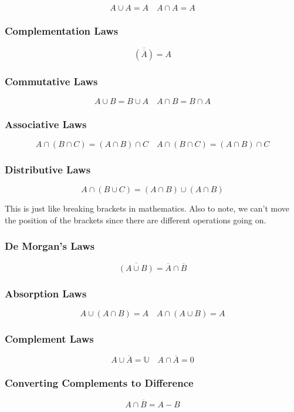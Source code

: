 \[
    A \cup A = A \quad A \cap A = A
\]

\subsubsection{Complementation Laws}\label{ssub:complementation_laws}

\[
    \overline{(\overline{A})} = A
\]

\subsubsection{Commutative Laws}\label{ssub:commutativepafour}

\[
    A \cup B = B \cup A \quad A \cap B = B\cap A
\]

\subsubsection{Associative Laws}\label{ssub:associateivepafour}

\[
    A \cap (B \cap C) = (A \cap B) \cap C \quad A \cap (B \cap C) = (A \cap B) \cap C
\]

\subsubsection{Distributive Laws}\label{ssub:distributive_laws}

\[
    A \cap (B \cup C) = (A \cap B) \cup (A \cap B)
\]
\begin{note}
    This is just like breaking brackets in mathematics. Also to note, we can't move the position of the brackets since there are different operations going on.
\end{note}

\subsubsection{De Morgan's Laws}\label{ssub:de_morgan_s_laws}

\[
    \overline{(A \cup B)} = \overline{A} \cap \overline{B}
\]

\subsubsection{Absorption Laws}\label{ssub:absorption_laws}

\[
    A \cup (A \cap B) = A \quad A \cap (A \cup B) = A
\]

\subsubsection{Complement Laws}\label{ssub:complement_laws}

\[
    A \cup \overline{A} = \mathbb{U} \quad A \cap \overline{A} = 0
\]

\subsubsection{Converting Complements to Difference}\label{ssub:converting_complements_to_difference}

\[
    A \cap \overline{B} = A - B
\]

